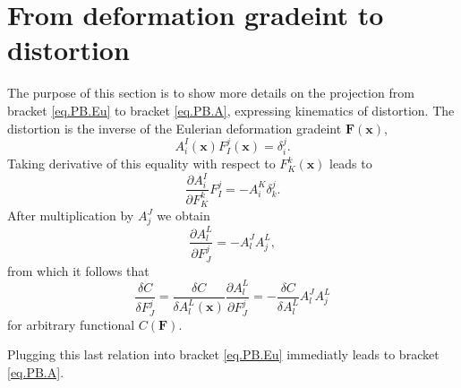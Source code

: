 \documentclass[
10pt, %
a4paper, %
oneside, %
headinclude,footinclude, %
BCOR5mm, %
]{scrartcl}
\newcommand{\xx}{\mathbf{x}}
\newcommand{\FF}{\mathbf{F}}
\begin{document}
\section{From deformation gradeint to distortion}\label{sec.F-A}
The purpose of this section is to show more details on the projection from bracket \eqref{eq.PB.Eu} to bracket \eqref{eq.PB.A}, expressing kinematics of distortion. The distortion is the inverse of the Eulerian deformation gradeint $\FF(\xx)$, 
\begin{equation}
	A^I_i(\xx) F^j_I(\xx) = \delta^j_i.
\end{equation}
Taking derivative of this equality with respect to $F^k_K(\xx)$ leads to
\begin{equation}
	\frac{\partial A^I_i}{\partial F^k_K} F^j_I = -A^K_i \delta^j_k.
\end{equation}
After multiplication by $A^J_j$ we obtain
\begin{equation}\label{app.eq.dAdF}
	\frac{\partial A^L_l}{\partial F^j_J} = -A^J_l A^L_j,
\end{equation}
from which it follows that 
\begin{equation}
	\frac{\delta C}{\delta F^j_J} = \frac{\delta C}{\delta A^L_l(\xx)} \frac{\partial A^L_l}{\partial F^j_J} = -\frac{\delta C}{\delta A^L_l} A^J_l A^L_j
\end{equation}
for arbitrary functional $C(\FF)$.

Plugging this last relation into bracket \eqref{eq.PB.Eu} immediatly leads to bracket \eqref{eq.PB.A}.
\end{document}
